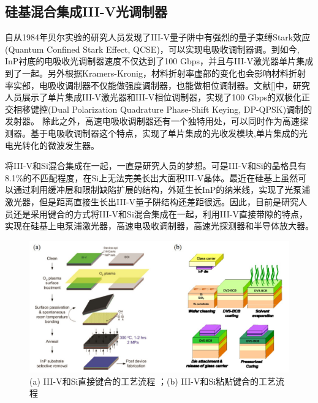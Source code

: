 \subsection{硅基混合集成III-V光调制器}
自从1984年贝尔实验的研究人员发现了III-V量子阱中有强烈的量子束缚Stark效应(Quantum Confined Stark Effect, QCSE)，可以实现电吸收调制器调\cite{miller1984band, wood1984high}。到如今, InP衬底的电吸收光调制器速度不仅达到了100 Gbps，并且与III-V激光器单片集成到了一起\cite{chacinski2009monolithically, kazmierski2009100}。另外根据Kramers-Kronig，材料折射率虚部的变化也会影响材料折射率实部，电吸收调制器不仅能做强度调制器，也能做相位调制器。文献[]中，研究人员展示了单片集成III-V激光器和III-V相位调制器，实现了100 Gbps的双极化正交相移键控(Dual Polarization Quadrature Phase-Shift Keying, DP-QPSK)调制的发射器\cite{poirier2015inp}。 除此之外，高速电吸收调制器还有一个独特用处，可以同时作为高速探测器\cite{miller1985electric}。基于电吸收调制器这个特点，实现了单片集成的光收发模块\cite{welstand1996dual,chen2016wavelength},单片集成的光电光转化的微波发生器\cite{zhou2014compact}。

将III-V和Si混合集成在一起，一直是研究人员的梦想。可是III-V和Si的晶格具有8.1\%的不匹配程度，在Si上无法完美长出大面积III-V晶体。最近在硅基上虽然可以通过利用缓冲层和限制缺陷扩展的结构，外延生长InP的纳米线，实现了光泵浦激光器\cite{wang2015room}，但是距离直接生长出III-V量子阱结构还差距很远。因此，目前是研究人员还是采用键合的方式将III-V和Si混合集成在一起，利用III-V直接带隙的特点，实现在硅基上电泵浦激光器，高速电吸收调制器，高速光探测器和半导体放大器\cite{liang2010hybrid,roelkens2010iii,liang2010recent,duan2014hybrid}。

\begin{figure}[htb]
	\centering
	\includegraphics[width=14cm]{./Pictures/fig_bonding_methods.jpg}
	\caption{ (a) III-V和Si直接键合的工艺流程 \cite{liang2010hybrid, roelkens2010iii}；(b) III-V和Si粘贴键合的工艺流程 \cite{liang2010hybrid, roelkens2010iii}}
\label{fig_bonding_methods}
\end{figure}


